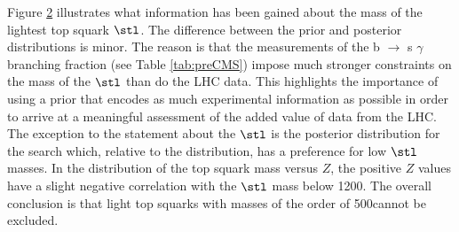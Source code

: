\begin{figure}[t]
    \vspace{1mm}
    \caption{}
    \label{fig:mLCSP}
\end{figure}


Figure \ref{fig:mt1} illustrates what information has been gained about the mass of the lightest top squark $\stl$.   
The difference between the prior and posterior distributions is minor. The reason is that 
 the measurements of the b $\to$ s $\gamma$ branching fraction (see 
Table \ref{tab:preCMS}) impose much stronger constraints on the mass of the  $\stl$
than do the LHC data. This highlights the
importance of using a prior that encodes as much experimental information as possible in order to arrive at
a meaningful assessment of the
added value of data from the LHC.
The exception to the statement about the $\stl$ is the posterior distribution for the \MTtwo{} search which, relative to the \preCMS distribution, has a preference for low $\stl$ masses. 
 In the distribution of the top squark mass versus $Z$, the positive $Z$ values have a slight negative correlation with the $\stl$ mass below 1200\GeV. The overall conclusion is that light top squarks with masses of the order of 500\GeV cannot be excluded.
 
\begin{figure}[t]
    \vspace{1mm}
    \caption{}
    \label{fig:mt1}
\end{figure}


